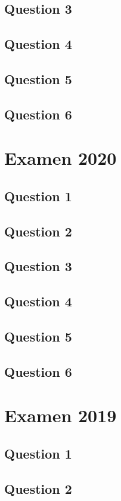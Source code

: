\subsection*{Question 3}
\subsection*{Question 4}
\subsection*{Question 5}
\subsection*{Question 6}

\newpage
\section{Examen 2020}
\subsection*{Question 1}
\subsection*{Question 2}
\subsection*{Question 3}
\subsection*{Question 4}
\subsection*{Question 5}
\subsection*{Question 6}

\newpage
\section{Examen 2019}
\subsection*{Question 1}
\subsection*{Question 2}
